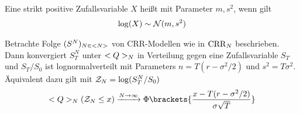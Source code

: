 \begin{definition}
	Eine strikt positive Zufallsvariable $X$ heißt  mit Parameter $m, s^2$, wenn gilt
	\begin{align*}
		\log(X) \sim \mathcal{N}(m,s^2)
	\end{align*}
\end{definition}
\begin{theorem}
	Betrachte Folge $(S^N)_{N \in <N>}$ von CRR-Modellen wie in $\operatorname{CRR}_N$ beschrieben. Dann konvergiert $S_T^N$ unter $<Q>_N$ in Verteilung gegen eine Zufallsvariable $S_T$ und $S_T/S_0$ ist lognormalverteilt mit Parameters $n = T(r - \sigma^2/2)$ und $s^2 = T\sigma^2$. Äquivalent dazu gilt mit $\mathcal{Z}_N = \log(S_T^N / S_0)$
	\begin{align*}
		\QQ_N(\ZZ_N \le x) \xrightarrow{N \to \infty} \Phi\brackets{\frac{x-T(r-\sigma^2/2)}{\sigma\sqrt{T}}}
	\end{align*}
\end{theorem}
